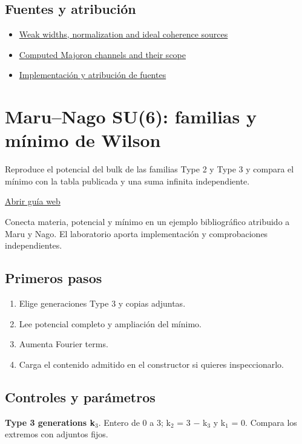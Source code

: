 \documentclass[11pt,a4paper]{article}
\begin{document}
\subsection*{Fuentes y atribución}
\begin{itemize}
\item \href{https://github.com/karlesmarin/ghu-lab/blob/main/docs/neutrino-decays.md}{Weak widths, normalization and ideal coherence sources}
\item \href{https://github.com/karlesmarin/ghu-lab/blob/main/docs/neutrino-majoron.md}{Computed Majoron channels and their scope}
\item \href{https://github.com/karlesmarin/ghu-lab/blob/main/src/view/neutrino_decay_panel.js}{Implementación y atribución de fuentes}
\end{itemize}
\section{Maru--Nago SU(6): familias y mínimo de Wilson}
Reproduce el potencial del bulk de las familias Type 2 y Type 3 y compara el mínimo con la tabla publicada y una suma infinita independiente.

\href{https://karlesmarin.github.io/ghu-explorer/guide/es/su6mn/index.html}{Abrir guía web}

Conecta materia, potencial y mínimo en un ejemplo bibliográfico atribuido a Maru y Nago. El laboratorio aporta implementación y comprobaciones independientes.
\subsection*{Primeros pasos}
\begin{enumerate}
\item Elige generaciones Type 3 y copias adjuntas.
\item Lee potencial completo y ampliación del mínimo.
\item Aumenta Fourier terms.
\item Carga el contenido admitido en el constructor si quieres inspeccionarlo.
\end{enumerate}
\subsection*{Controles y parámetros}
\textbf{Type 3 generations k\ensuremath{{}_{3}}}. Entero de 0 a 3; k\ensuremath{{}_{2}} = 3 \ensuremath{-} k\ensuremath{{}_{3}} y k\ensuremath{{}_{1}} = 0. Compara los extremos con adjuntos fijos.
\end{document}
